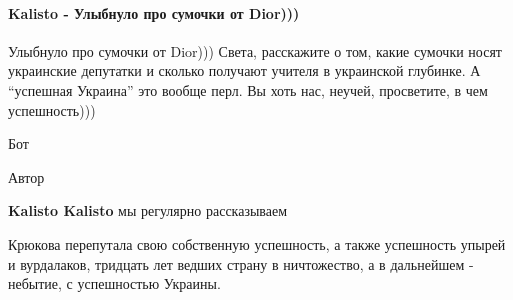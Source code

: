  
 
 
 
 
\paragraph{Kalisto - Улыбнуло про сумочки от Dior)))}

\begin{itemize}
 
Улыбнуло про сумочки от Dior))) Света, расскажите о том, какие сумочки носят украинские депутатки и сколько получают учителя в украинской глубинке. А \enquote{успешная Украина} это вообще перл. Вы хоть нас, неучей, просветите, в чем успешность)))

\begin{itemize}
 
Бот


Автор
 
\textbf{Kalisto Kalisto} мы регулярно рассказываем

 

Крюкова перепутала свою собственную успешность, а также успешность упырей и
вурдалаков, тридцать лет ведших страну в ничтожество, а в дальнейшем - небытие,
с успешностью Украины.


\end{itemize}
\end{itemize}
